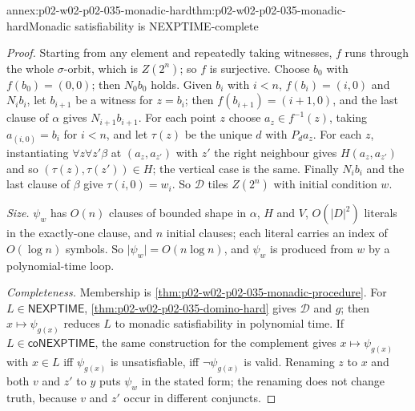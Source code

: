 \begin{annexitem}{annex:p02-w02-p02-035-monadic-hard}{thm:p02-w02-p02-035-monadic-hard}{Monadic satisfiability is NEXPTIME-complete}
\begin{proof}
Starting from any element and repeatedly taking witnesses, \(f\) runs
through the whole \(\sigma\)-orbit, which is \(Z(2^n)\); so \(f\) is
surjective.  Choose \(b_0\) with \(f(b_0)=(0,0)\); then \(N_0b_0\) holds.
Given \(b_i\) with \(i<n\), \(f(b_i)=(i,0)\) and \(N_ib_i\), let \(b_{i+1}\) be
a witness for \(z=b_i\); then \(f(b_{i+1})=(i+1,0)\), and the last clause of
\(\alpha\) gives \(N_{i+1}b_{i+1}\).  For each point \(z\) choose
\(a_z\in f^{-1}(z)\), taking \(a_{(i,0)}=b_i\) for \(i<n\), and let \(\tau(z)\)
be the unique \(d\) with \(P_da_z\).  For each \(z\), instantiating
\(\forall z\forall z'\beta\) at \((a_z,a_{z'})\) with \(z'\) the right
neighbour gives \(H(a_z,a_{z'})\) and so \((\tau(z),\tau(z'))\in H\); the
vertical case is the same.  Finally \(N_ib_i\) and the last clause of
\(\beta\) give \(\tau(i,0)=w_i\).  So \(\mathcal D\) tiles \(Z(2^n)\) with
initial condition \(w\).

\emph{Size.}  \(\psi_w\) has \(O(n)\) clauses of bounded shape in
\(\alpha\), \(H\) and \(V\), \(O(\lvert D\rvert^2)\) literals in the
exactly-one clause, and \(n\) initial clauses; each literal carries an index
of \(O(\log n)\) symbols.  So \(\lvert\psi_w\rvert=O(n\log n)\), and \(\psi_w\)
is produced from \(w\) by a polynomial-time loop.

\emph{Completeness.}  Membership is
\cref{thm:p02-w02-p02-035-monadic-procedure}.  For \(L\in\mathsf{NEXPTIME}\),
\cref{thm:p02-w02-p02-035-domino-hard} gives \(\mathcal D\) and \(g\); then
\(x\mapsto\psi_{g(x)}\) reduces \(L\) to monadic satisfiability in polynomial
time.  If \(L\in\mathsf{coNEXPTIME}\), the same construction for the
complement gives \(x\mapsto\psi_{g(x)}\) with \(x\in L\) iff \(\psi_{g(x)}\) is
unsatisfiable, iff \(\neg\psi_{g(x)}\) is valid.  Renaming \(z\) to \(x\) and
both \(v\) and \(z'\) to \(y\) puts \(\psi_w\) in the stated form; the renaming
does not change truth, because \(v\) and \(z'\) occur in different conjuncts.
\end{proof}
\end{annexitem}

